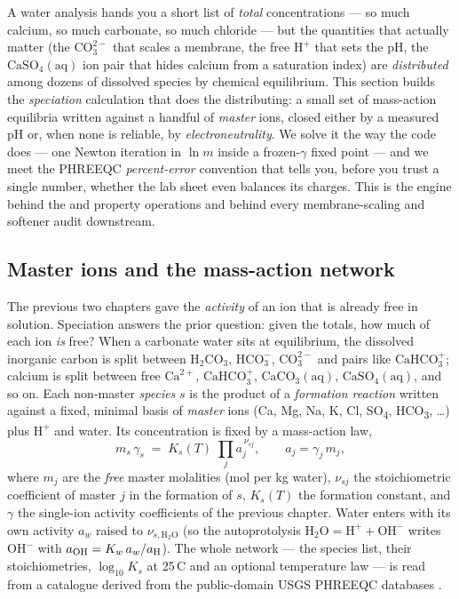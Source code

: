 \documentclass[11pt,a4paper]{article}
\begin{document}
\begin{whatyoulllearn}
A water analysis hands you a short list of \emph{total} concentrations
--- so much calcium, so much carbonate, so much chloride --- but the
quantities that actually matter (the $\text{CO}_3^{2-}$ that scales a
membrane, the free $\text{H}^+$ that sets the pH, the
$\text{CaSO}_4(\text{aq})$ ion pair that hides calcium from a saturation
index) are \emph{distributed} among dozens of dissolved species by
chemical equilibrium.  This section builds the \emph{speciation}
calculation that does the distributing: a small set of mass-action
equilibria written against a handful of \emph{master} ions, closed either
by a measured pH or, when none is reliable, by \emph{electroneutrality}.
We solve it the way the code does --- one Newton iteration in $\ln m$
inside a frozen-$\gamma$ fixed point --- and we meet the PHREEQC
\emph{percent-error} convention that tells you, before you trust a single
number, whether the lab sheet even balances its charges.  This is the
engine behind the  and  property
operations and behind every membrane-scaling and softener audit
downstream.
\end{whatyoulllearn}

\subsection{Master ions and the mass-action network}

The previous two chapters gave the \emph{activity} of an ion that is
already free in solution.  Speciation answers the prior question: given
the totals, how much of each ion \emph{is} free?  When a carbonate water
sits at equilibrium, the dissolved inorganic carbon is split between
$\text{H}_2\text{CO}_3$, $\text{HCO}_3^-$, $\text{CO}_3^{2-}$ and pairs
like $\text{CaHCO}_3^+$; calcium is split between free $\text{Ca}^{2+}$,
$\text{CaHCO}_3^+$, $\text{CaCO}_3(\text{aq})$,
$\text{CaSO}_4(\text{aq})$, and so on.  Each non-master \emph{species}
$s$ is the product of a \emph{formation reaction} written against a
fixed, minimal basis of \emph{master} ions (Ca, Mg, Na, K, Cl,
SO\textsubscript{4}, HCO\textsubscript{3}, \dots) plus $\text{H}^+$ and
water.  Its concentration is fixed by a mass-action law,
\begin{equation}
   m_s\,\gamma_s \;=\; K_s(T)\;\prod_j a_j^{\,\nu_{sj}},
   \qquad a_j = \gamma_j\,m_j,
   \label{eq:spec-massaction}
\end{equation}
where $m_j$ are the \emph{free} master molalities (mol per kg water),
$\nu_{sj}$ the stoichiometric coefficient of master $j$ in the formation
of $s$, $K_s(T)$ the formation constant, and $\gamma$ the single-ion
activity coefficients of the previous chapter.  Water enters with its
own activity $a_w$ raised to $\nu_{s,\mathrm{H_2O}}$ (so the
autoprotolysis $\text{H}_2\text{O} = \text{H}^+ + \text{OH}^-$ writes
$\text{OH}^-$ with $a_{\rm OH}=K_w\,a_w/a_{\rm H}$).  The whole network
--- the species list, their stoichiometries, $\log_{10}K_s$ at
25\,\textdegree C and an optional temperature law --- is read from a
 catalogue derived from the public-domain USGS
PHREEQC databases \cite{Parkhurst2013}.
\end{document}

